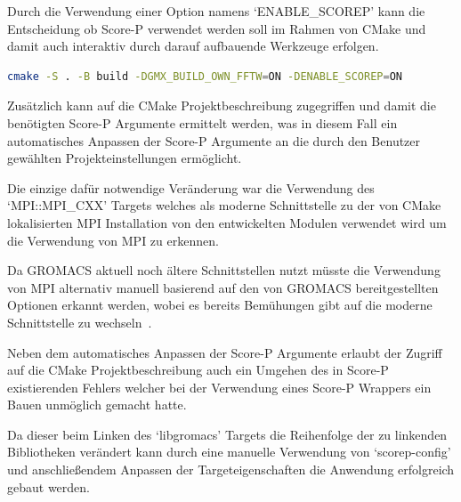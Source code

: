 \documentclass[german,proseminar,hyperref,utf8]{zihpub}
\begin{document}
    Durch die Verwendung einer Option namens `ENABLE\_SCOREP' kann die Entscheidung ob Score-P verwendet
    werden soll im Rahmen von CMake und damit auch interaktiv durch darauf aufbauende Werkzeuge erfolgen.

    \begin{lstlisting}[caption=Aktivieren von Score-P bei GROMACS, gobble=8, showstringspaces=false, basicstyle=\small, language=bash]
        cmake -S . -B build -DGMX_BUILD_OWN_FFTW=ON -DENABLE_SCOREP=ON
    \end{lstlisting}

    Zusätzlich kann auf die CMake Projektbeschreibung zugegriffen und damit die benötigten Score-P Argumente
    ermittelt werden, was in diesem Fall ein automatisches Anpassen der Score-P Argumente an die
    durch den Benutzer gewählten Projekteinstellungen ermöglicht.

    Die einzige dafür notwendige Veränderung war die Verwendung des `MPI::MPI\_CXX' Targets welches
    als moderne Schnittstelle zu der von CMake lokalisierten MPI Installation von den entwickelten
    Modulen verwendet wird um die Verwendung von MPI zu erkennen.

    Da GROMACS aktuell noch ältere Schnittstellen nutzt müsste die Verwendung von MPI alternativ
    manuell basierend auf den von GROMACS bereitgestellten Optionen erkannt werden, wobei es bereits
    Bemühungen gibt auf die moderne Schnittstelle zu wechseln~.

    Neben dem automatisches Anpassen der Score-P Argumente erlaubt der Zugriff auf die CMake
    Projektbeschreibung auch ein Umgehen des in Score-P existierenden Fehlers welcher bei der
    Verwendung eines Score-P Wrappers ein Bauen unmöglich gemacht hatte.

    Da dieser beim Linken des `libgromacs' Targets die Reihenfolge der zu linkenden Bibliotheken
    verändert kann durch eine manuelle Verwendung von `scorep-config' und anschließendem Anpassen
    der Targeteigenschaften die Anwendung erfolgreich gebaut werden.
\end{document}
